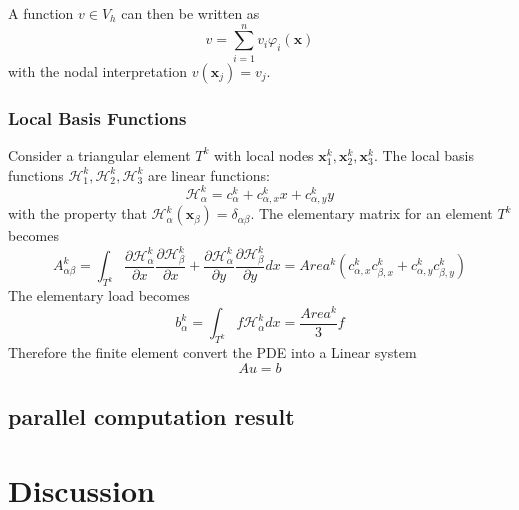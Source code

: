 \documentclass[11pt]{article}
\begin{document}
A function $v\in V_h$ can then be written as
\begin{equation}
    v =\sum_{i=1}^n v_i\varphi_i(\mathbf{x})
\end{equation}
with the nodal interpretation $v(\mathbf{x}_j) = v_j$.
\subsubsection{Local Basis Functions}
Consider a triangular element $T^k$ with local nodes $\mathbf{x}_1^k,\mathbf{x}_2^k,\mathbf{x}_3^k$. The local basis functions $\mathcal{H}_1^k,\mathcal{H}_2^k,\mathcal{H}_3^k$ are linear functions:
\begin{equation}
    \mathcal{H}_\alpha^k = c_\alpha^k + c_{\alpha,x}^kx + c_{\alpha,y}^ky 
\end{equation}
with the property that $\mathcal{H}_\alpha^k(\mathbf{x}_\beta) = \delta_{\alpha\beta}$.
The elementary matrix for an element $T^k$ becomes 
\begin{equation}
    A^k_{\alpha\beta} = \int_{T^k} \frac{\partial \mathcal H^k_\alpha}{\partial x}\frac{\partial \mathcal H^k_\beta}{\partial x} + \frac{\partial  \mathcal H^k_\alpha}{\partial y}\frac{\partial \mathcal H^k_\beta}{\partial y} dx = Area^k( c_{\alpha,x}^kc_{\beta,x}^k + c_{\alpha,y}^kc_{\beta,y}^k)
\end{equation}
The elementary load becomes
\begin{equation}
b_{\alpha}^k = \int_{T^k} f \mathcal H_\alpha^k dx
= \frac{Area^k}{3} f
\end{equation}
Therefore the finite element convert the PDE into a Linear system
\begin{equation}
    A u = b
\end{equation}
\subsection{parallel computation result}

\section{Discussion}
\end{document}
